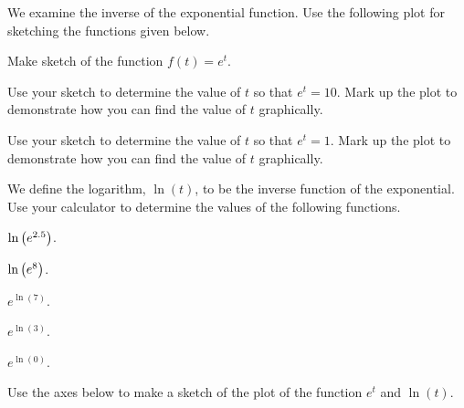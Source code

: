 \begin{problem}
\item We examine the inverse of the exponential function. Use the
  following plot for sketching the functions given below.

  \scalebox{0.75}{}

  \begin{subproblem}
  \item Make sketch of the function $f(t) = e^t$.
  \item Use your sketch to determine the value of $t$ so that
    $e^t=10$. Mark up the plot to demonstrate how you can find the
    value of $t$ graphically.
  \item Use your sketch to determine the value of $t$ so that
    $e^t=1$. Mark up the plot to demonstrate how you can find the
    value of $t$ graphically.
  \end{subproblem}

  \clearpage

\item We define the logarithm, $\ln(t)$, to be the inverse function of
  the exponential.  Use your calculator to determine the values of the
  following functions.
  \begin{subproblem}
  \item $\ln\left( e^{2.5} \right)$.
    \vfill
  \item $\ln\left( e^{8} \right)$.
    \vfill
  \item $e^{\ln(7)}$.
    \vfill
  \item $e^{\ln(3)}$.
    \vfill
  \item $e^{\ln(0)}$.
    \vfill
  \end{subproblem}

  \clearpage

\item Use the axes below to make a sketch of the plot of the function
  $e^t$ and $\ln(t)$.

  \scalebox{0.75}{}

\end{problem}

